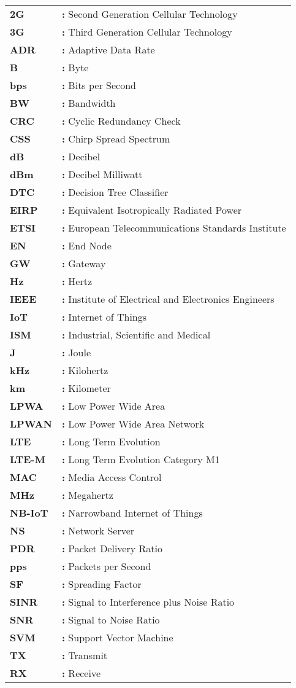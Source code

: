 \hspace{-3mm}
\begin{tabular}{p{2cm}l}
{\bf 2G} & {\bf:} Second Generation Cellular Technology\\
{\bf 3G} & {\bf:} Third Generation Cellular Technology\\
{\bf ADR} & {\bf:} Adaptive Data Rate\\
{\bf B} & {\bf:} Byte\\
{\bf bps} & {\bf:} Bits per Second\\
{\bf BW} & {\bf:} Bandwidth\\
{\bf CRC} & {\bf:} Cyclic Redundancy Check\\
{\bf CSS} & {\bf:} Chirp Spread Spectrum\\
{\bf dB} & {\bf:} Decibel\\
{\bf dBm} & {\bf:} Decibel Milliwatt\\
{\bf DTC} & {\bf:} Decision Tree Classifier\\
{\bf EIRP} & {\bf:} Equivalent Isotropically Radiated Power\\
{\bf ETSI} & {\bf:} European Telecommunications Standards Institute\\
{\bf EN} & {\bf:} End Node\\
{\bf GW} & {\bf:} Gateway\\
{\bf Hz} & {\bf:} Hertz\\
{\bf IEEE} & {\bf:} Institute of Electrical and Electronics Engineers\\
{\bf IoT} & {\bf:} Internet of Things\\
{\bf ISM} & {\bf:} Industrial, Scientific and Medical\\
{\bf J} & {\bf:} Joule\\
{\bf kHz} & {\bf:} Kilohertz\\
{\bf km} & {\bf:} Kilometer\\
{\bf LPWA} & {\bf:} Low Power Wide Area\\
{\bf LPWAN} & {\bf:} Low Power Wide Area Network\\
{\bf LTE} & {\bf:} Long Term Evolution\\
{\bf LTE-M} & {\bf:}  Long Term Evolution Category M1\\
{\bf MAC} & {\bf:} Media Access Control\\
{\bf MHz} & {\bf:} Megahertz\\
{\bf NB-IoT} & {\bf:} Narrowband Internet of Things\\
{\bf NS} & {\bf:} Network Server\\
{\bf PDR} & {\bf:} Packet Delivery Ratio\\
{\bf pps} & {\bf:} Packets per Second\\
{\bf SF} & {\bf:} Spreading Factor\\
{\bf SINR} & {\bf:} Signal to Interference plus Noise Ratio\\
{\bf SNR} & {\bf:} Signal to Noise Ratio\\
{\bf SVM} & {\bf:} Support Vector Machine\\
{\bf TX} & {\bf:} Transmit\\
{\bf RX} & {\bf:} Receive\\
\end{tabular}

